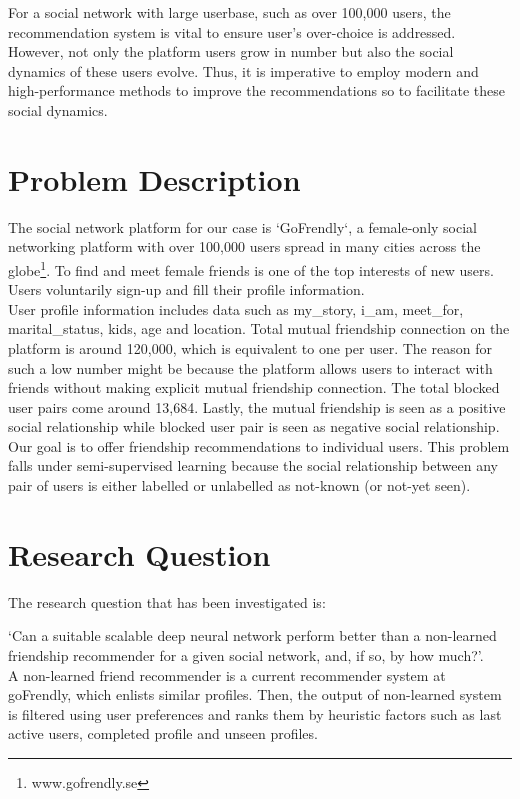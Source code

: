 \documentclass{kththesis}
\begin{document}
\newpage
For a social network with large userbase, such as over 100,000 users, the recommendation system is vital to ensure user's over-choice is addressed. However, not only the platform users grow in number but also the social dynamics of these users evolve. Thus, it is imperative to employ modern and high-performance methods to improve the recommendations so to facilitate these social dynamics. 

\section{Problem Description}
The social network platform for our case is `GoFrendly`, a female-only social networking platform with over 100,000 users spread in many cities across the globe\footnote{www.gofrendly.se}. To find and meet female friends is one of the top interests of new users. Users voluntarily sign-up and fill their profile information. \\

User profile information includes data such as my\_story, i\_am, meet\_for, marital\_status, kids, age and location. Total mutual friendship connection on the platform is around 120,000, which is equivalent to one per user. The reason for such a low number might be because the platform allows users to interact with friends without making explicit mutual friendship connection. The total blocked user pairs come around 13,684. Lastly, the mutual friendship is seen as a positive social relationship while blocked user pair is seen as negative social relationship. \\

Our goal is to offer friendship recommendations to individual users. This problem falls under semi-supervised learning because the social relationship between any pair of users is either labelled or unlabelled as not-known (or not-yet seen). 

\section{Research Question}
The research question that has been investigated is:

`Can a suitable scalable deep neural network perform better than a non-learned friendship recommender for a given social network, and, if so, by how much?’. \\

A non-learned friend recommender is a current recommender system at goFrendly, which enlists similar profiles. Then, the output of non-learned system is filtered using user preferences and ranks them by heuristic factors such as last active users, completed profile and unseen profiles.\\
\end{document}
